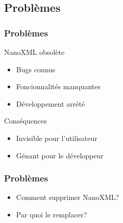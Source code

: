 \subsection{Problèmes}
\begin{frame}\frametitle{Problèmes}
	\begin{beamerboxesrounded}[shadow=true]{NanoXML obsolète}
		\begin{itemize}
		\item Bugs connus
		\item Foncionnalités manquantes
		\item Développement arrété
		\end{itemize}
	\end{beamerboxesrounded}
	\vfill
	\begin{beamerboxesrounded}[shadow=true]{Conséquences}
		\begin{itemize}
			\item Invisible pour l'utilisateur
			\item Génant pour le développeur	
		\end{itemize}
	\end{beamerboxesrounded}
\end{frame}
\begin{frame}\frametitle{Problèmes}
\begin{itemize}
	\item Comment supprimer NanoXML?
	\item Par quoi le remplacer?
\end{itemize}
\end{frame}
